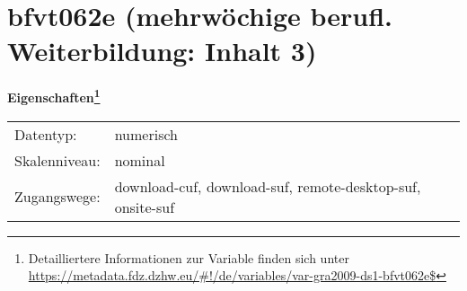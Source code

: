 
    \setcounter{footnote}{0}

    \vspace*{-1.8cm}
	\section{bfvt062e (mehrwöchige berufl. Weiterbildung: Inhalt 3)}
	\label{section:bfvt062e}



    \vspace*{0.5cm}
    \noindent\textbf{Eigenschaften\footnote{Detailliertere Informationen zur Variable finden sich unter
		\url{https://metadata.fdz.dzhw.eu/\#!/de/variables/var-gra2009-ds1-bfvt062e$}}}\\
	\begin{tabularx}{\hsize}{@{}lX}
	Datentyp: & numerisch \\
	Skalenniveau: & nominal \\
	Zugangswege: &
	  download-cuf, 
	  download-suf, 
	  remote-desktop-suf, 
	  onsite-suf
 \\
    \end{tabularx}



